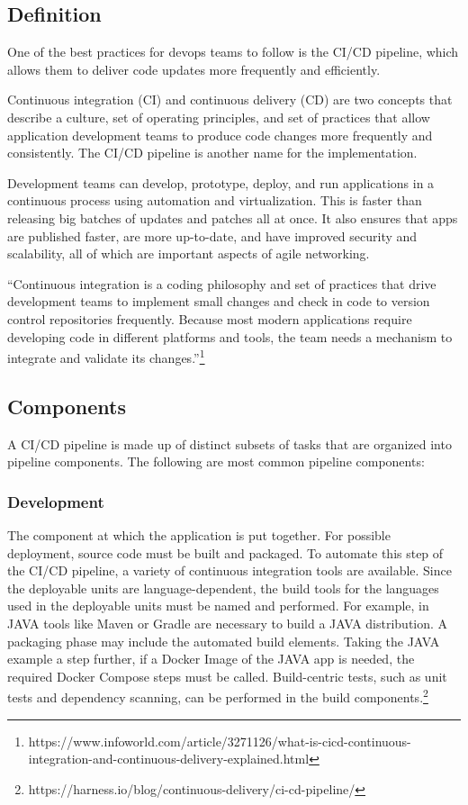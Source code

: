 \subsection{Definition}
%
One of the best practices for devops teams to follow is the CI/CD pipeline, which allows them to deliver code updates more frequently and efficiently.


Continuous integration (CI) and continuous delivery (CD) are two concepts that describe a culture, set of operating principles, and set of practices that allow application development teams to produce code changes more frequently and consistently. The CI/CD pipeline is another name for the implementation.

Development teams can develop, prototype, deploy, and run applications in a continuous process using automation and virtualization. This is faster than releasing big batches of updates and patches all at once. It also ensures that apps are published faster, are more up-to-date, and have improved security and scalability, all of which are important aspects of agile networking.

“Continuous integration is a coding philosophy and set of practices that drive development teams to implement small changes and check in code to version control repositories frequently. Because most modern applications require developing code in different platforms and tools, the team needs a mechanism to integrate and validate its changes.”\footnote{https://www.infoworld.com/article/3271126/what-is-cicd-continuous-integration-and-continuous-delivery-explained.html}

%
\subsection{Components}
%
A CI/CD pipeline is made up of distinct subsets of tasks that are organized into pipeline components. The following are most common pipeline components:

\subsubsection{Development}


The component at which the application is put together. For possible deployment, source code must be built and packaged. To automate this step of the CI/CD pipeline, a variety of continuous integration tools are available. Since the deployable units are language-dependent, the build tools for the languages used in the deployable units must be named and performed. For example, in JAVA tools like Maven or Gradle are necessary to build a JAVA distribution. A packaging phase may include the automated build elements. Taking the JAVA example a step further, if a Docker Image of the JAVA app is needed, the required Docker Compose steps must be called. Build-centric tests, such as unit tests and dependency scanning, can be performed in the build components.\footnote{https://harness.io/blog/continuous-delivery/ci-cd-pipeline/}


